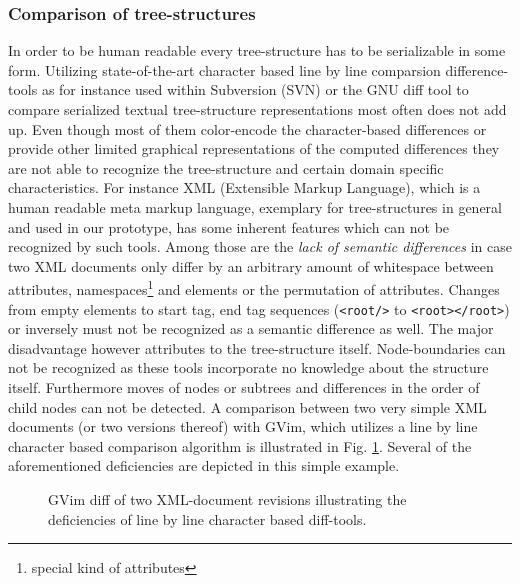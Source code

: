 \subsubsection{Comparison of tree-structures}
In order to be human readable every tree-structure has to be serializable in some form. Utilizing state-of-the-art character based line by line comparsion difference-tools as for instance used within Subversion (SVN\cite{SUBVERSION}) or the GNU diff tool to compare serialized textual tree-structure representations most often does not add up. Even though most of them color-encode the character-based differences or provide other limited graphical representations of the computed differences they are not able to recognize the tree-structure and certain domain specific characteristics. For instance XML (Extensible Markup Language), which is a human readable meta markup language, exemplary for tree-structures in general and used in our prototype, has some inherent features which can not be recognized by such tools. Among those are the \emph{lack of semantic differences} in case two XML documents only differ by an arbitrary amount of whitespace between attributes, namespaces\footnote{special kind of attributes} and elements or the permutation of attributes. Changes from empty elements to start tag, end tag sequences (\texttt{<root/>} to \texttt{<root></root>}) or inversely must not be recognized as a semantic difference as well. The major disadvantage however attributes to the tree-structure itself. Node-boundaries can not be recognized as these tools incorporate no knowledge about the structure itself. Furthermore moves of nodes or subtrees and differences in the order of child nodes can not be detected. A comparison between two very simple XML documents (or two versions thereof) with GVim, which utilizes a line by line character based comparison algorithm is illustrated in Fig. \ref{fig:faileddiff}. Several of the aforementioned deficiencies are depicted in this simple example. 

\begin{figure}[tb]
\caption{\label{fig:faileddiff} GVim diff of two XML-document revisions illustrating the deficiencies of line by line character based diff-tools.}
\end{figure}


